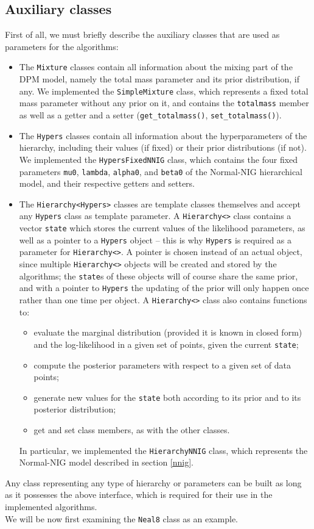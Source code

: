 \subsection{Auxiliary classes}
First of all, we must briefly describe the auxiliary classes that are used as parameters for the algorithms:
\begin{itemize}
	\item The \verb|Mixture| classes contain all information about the mixing part of the DPM model, namely the total mass parameter and its prior distribution, if any.
	We implemented the \verb|SimpleMixture| class, which represents a fixed total mass parameter without any prior on it, and contains the \verb|totalmass| member as well as a getter and a setter (\verb|get_totalmass()|, \verb|set_totalmass()|).
	\item The \verb|Hypers| classes contain all information about the hyperparameters of the hierarchy, including their values (if fixed) or their prior distributions (if not).
	We implemented the \verb|HypersFixedNNIG| class, which contains the four fixed parameters \verb|mu0|, \verb|lambda|, \verb|alpha0|, and \verb|beta0| of the Normal-NIG hierarchical model, and their respective getters and setters.
	\item The \verb|Hierarchy<Hypers>| classes are template classes themselves and accept any \verb|Hypers| class as template parameter.
	A \verb|Hierarchy<>| class contains a vector \verb|state| which stores the current values of the likelihood parameters, as well as a pointer to a \verb|Hypers| object -- this is why \verb|Hypers| is required as a parameter for \verb|Hierarchy<>|.
	A pointer is chosen instead of an actual object, since multiple \verb|Hierarchy<>| objects will be created and stored by the algorithms; the \verb|state|s of these objects will of course share the same prior, and with a pointer to \verb|Hypers| the updating of the prior will only happen once rather than one time per object.
	A \verb|Hierarchy<>| class also contains functions to:
	\begin{itemize}
		\item evaluate the marginal distribution (provided it is known in closed form) and the log-likelihood in a given set of points, given the current \verb|state|;
		\item compute the posterior parameters with respect to a given set of data points;
		\item generate new values for the \verb|state| both according to its prior and to its posterior distribution;
		\item get and set class members, as with the other classes.
	\end{itemize}
	In particular, we implemented the \verb|HierarchyNNIG| class, which represents the Normal-NIG model described in section \ref{nnig}.
\end{itemize}
Any class representing any type of hierarchy or parameters can be built as long as it possesses the above interface, which is required for their use in the implemented algorithms. \\
We will be now first examining the \verb|Neal8| class as an example.

